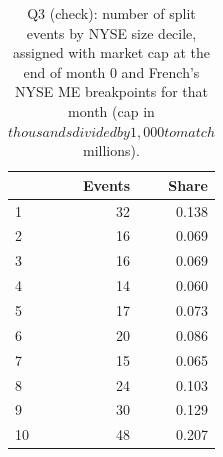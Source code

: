 \begin{table}[!htbp]
\centering
\small
\caption{Q3 (check): number of split events by NYSE size decile, assigned with market cap at the end of month 0 and French's NYSE ME breakpoints for that month (cap in $ thousands divided by 1,000 to match $ millions).}
\label{tab:decile}
\begin{tabular}{lrr}
\toprule
 & Events & Share \\
\midrule
1 & 32 & 0.138 \\
2 & 16 & 0.069 \\
3 & 16 & 0.069 \\
4 & 14 & 0.060 \\
5 & 17 & 0.073 \\
6 & 20 & 0.086 \\
7 & 15 & 0.065 \\
8 & 24 & 0.103 \\
9 & 30 & 0.129 \\
10 & 48 & 0.207 \\
\bottomrule
\end{tabular}
\end{table}
